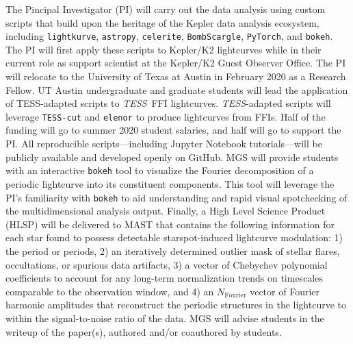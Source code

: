 \documentclass[letterpaper,11pt]{article}
\newcommand{\tess}{{\it TESS}}
\begin{document}
The Pincipal Investigator (PI) will carry out the data analysis using custom scripts that build upon the heritage of the Kepler data analysis ecosystem, including \texttt{lightkurve}, \texttt{astropy}, \texttt{celerite}, \texttt{BombScargle}, \texttt{PyTorch}, and \texttt{bokeh}.  The PI will first apply these scripts to Kepler/K2 lightcurves while in their current role as support scientist at the Kepler/K2 Guest Observer Office.  The PI will relocate to the University of Texas at Austin in February 2020 as a Research Fellow.  UT Austin undergraduate and graduate students will lead the application of TESS-adapted scripts to \tess\ FFI lightcurves.  \tess-adapted scripts will leverage \texttt{TESS-cut} and \texttt{elenor} to produce lightcurves from FFIs.  Half of the funding will go to summer 2020 student salaries, and half will go to support the PI.  All reproducible scripts---including Jupyter Notebook tutorials---will be publicly available and developed openly on GitHub.  MGS will provide students with an interactive \texttt{bokeh} tool to visualize the Fourier decomposition of a periodic lightcurve into its constituent components.  This tool will leverage the PI's familiarity with \texttt{bokeh} to aid understanding and rapid visual spotchecking of the multidimensional analysis output.  Finally, a High Level Science Product (HLSP) will be delivered to MAST that contains the following information for each star found to possess detectable starspot-induced lightcurve modulation: 1) the period or periods, 2) an iteratively determined outlier mask of stellar flares, occultations, or spurious data artifacts, 3) a vector of Chebychev polynomial coefficients to account for any long-term normalization trends on timescales comparable to the observation window, and 4) an $N_{\mathrm{Fourier}}$ vector of Fourier harmonic amplitudes that reconstruct the periodic structures in the lightcurve to within the signal-to-noise ratio of the data.  MGS will advise students in the writeup of the paper(s), authored and/or coauthored by students.


\end{document}
